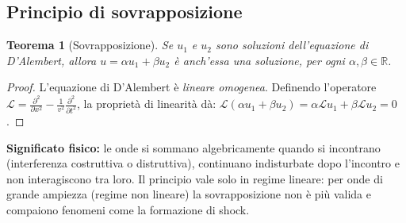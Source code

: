 \documentclass[11pt,a4paper]{article}
\theoremstyle{plain}
\newtheorem{teorema}{Teorema}[section]
\theoremstyle{definition}
\theoremstyle{remark}
\begin{document}
\subsection{Principio di sovrapposizione}

\begin{teorema}[Sovrapposizione]
Se $u_1$ e $u_2$ sono soluzioni dell'equazione di D'Alembert, allora
$u=\alpha u_1+\beta u_2$ è anch'essa una soluzione, per ogni
$\alpha,\beta\in\mathbb{R}$.
\end{teorema}
\begin{proof}
L'equazione di D'Alembert è \emph{lineare omogenea}. Definendo l'operatore
$\mathcal{L}=\frac{\partial^2}{\partial x^2}-\frac{1}{v^2}\frac{\partial^2}{\partial t^2}$,
la proprietà di linearità dà:
$\mathcal{L}(\alpha u_1+\beta u_2)=\alpha\mathcal{L}u_1+\beta\mathcal{L}u_2=0$.
\end{proof}
\textbf{Significato fisico:} le onde si sommano algebricamente quando si
incontrano (interferenza costruttiva o distruttiva), continuano indisturbate
dopo l'incontro e non interagiscono tra loro. Il principio vale solo in regime
lineare: per onde di grande ampiezza (regime non lineare) la sovrapposizione
non è più valida e compaiono fenomeni come la formazione di shock.
\end{document}
